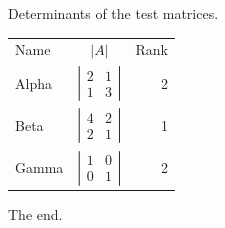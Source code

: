 \documentclass{article}
\begin{document}
Determinants of the test matrices.

\begin{tabular}{lcr}
Name & $|A|$ & Rank \\
Alpha & $\left|\begin{matrix}2&1\\1&3\end{matrix}\right|$ & 2 \\
Beta & $\left|\begin{matrix}4&2\\2&1\end{matrix}\right|$ & 1 \\
Gamma & $\left|\begin{matrix}1&0\\0&1\end{matrix}\right|$ & 2 \\
\end{tabular}

The end.
\end{document}
